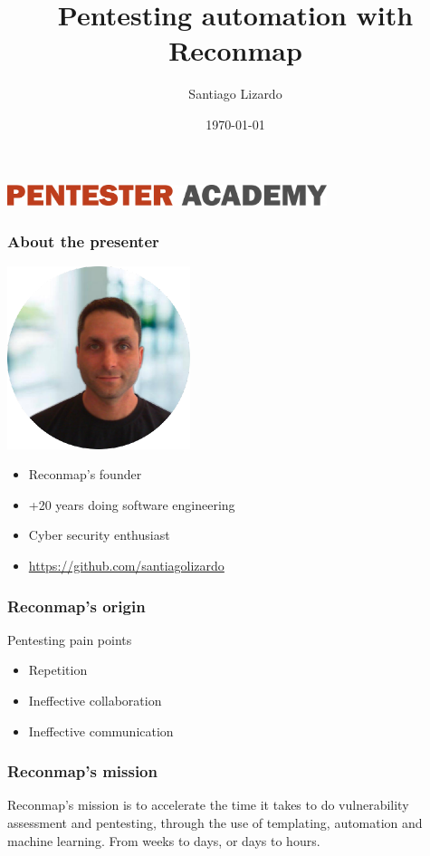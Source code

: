 \documentclass{beamer}
\title{Pentesting automation with \textbf{Reconmap}}
\author{Santiago Lizardo}
\date{\today}
\begin{document}
\begin{frame}
	\begin{center}
	\includegraphics[width=0.7\textwidth]{images/pentester-academy-logo.png}	
	\end{center}

	\maketitle
\end{frame}

\begin{frame}
	\frametitle{About the presenter}

	\includegraphics[width=0.4\textwidth]{images/santiago-lizardo.png}

	\begin{itemize}
		\item Reconmap's founder
		\item +20 years doing software engineering
		\item Cyber security enthusiast
		\item \href{https://github.com/santiagolizardo}{https://github.com/santiagolizardo}
	\end{itemize}
\end{frame}

\begin{frame}
	\frametitle{Reconmap's origin}

	Pentesting pain points	
	\begin{itemize}
		\item Repetition	
		\item Ineffective collaboration
		\item Ineffective communication
	\end{itemize}
\end{frame}

\begin{frame}
	\frametitle{Reconmap's mission}
	
	Reconmap's mission is to accelerate the time it takes to do vulnerability assessment and pentesting, through the use of templating, automation and machine learning. From weeks to days, or days to hours.
\end{frame}
\end{document}
